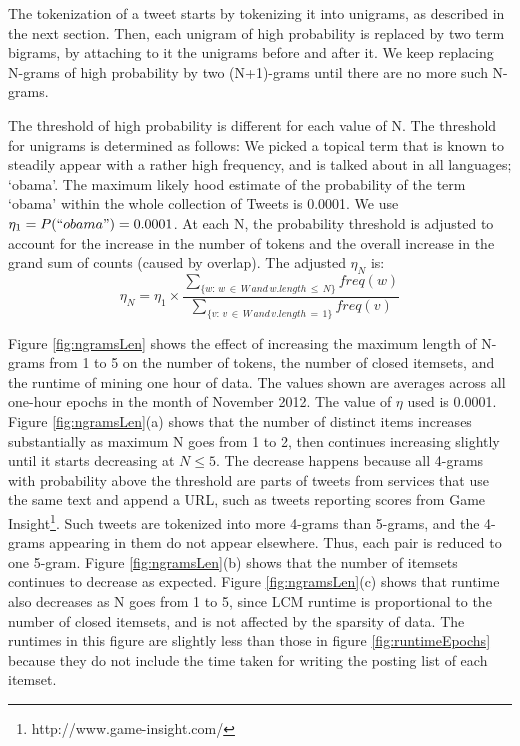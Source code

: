 \documentclass[letterpaper,12pt,titlepage,oneside,final]{book}
\begin{document}
The tokenization of a tweet starts by tokenizing it into unigrams, 
as described in the next section. %
Then, each
unigram of high probability is replaced by two term bigrams, by
attaching to it the unigrams before and after it.
We keep replacing N-grams of high probability by two (N+1)-grams 
until there are no more such N-grams. %

The threshold of high probability is different for each value of N. 
The threshold for unigrams is determined as follows: 
We picked a topical term that is known to  steadily  appear with a rather high frequency, 
and is talked about in all languages; `obama'. 
The maximum likely hood estimate of the probability of the term `obama' within the whole collection of Tweets is 0.0001. 
We use $\eta_1 = P(``obama") = 0.0001$.
At each N, the probability threshold is adjusted to account for the increase
in the number of tokens and the overall increase in the grand sum of counts (caused by overlap).
The adjusted $\eta_N$ is:
\begin{equation}\eta_N = \eta_1 \times \frac{\sum_{\{w:\, w \,\in\, W\, and\, w.length \,\le\, N\}}{freq(w)}}{\sum_{\{v:\, v\, \in\, W \,and \,v.length\,=\,1\}}{freq(v)}}\end{equation}


Figure \ref{fig:ngramsLen} shows the effect of increasing the maximum length
of N-grams from 1 to 5 on the number of tokens, the number of closed itemsets,
and the runtime of mining one hour of data.
The values shown are averages across all one-hour epochs in the month of
November 2012.
The value of $\eta$ used is 0.0001.
Figure \ref{fig:ngramsLen}(a) shows that the number of distinct items
increases substantially as maximum N goes from 1 to 2, then continues increasing
slightly until it starts decreasing at $N \le 5$.
The decrease happens because all 4-grams with probability above the threshold
are parts of tweets from services that use the same text and append a URL,
such as tweets reporting scores from
Game Insight\footnote{http://www.game-insight.com/}.
Such tweets are tokenized into more 4-grams than 5-grams, and the 4-grams
appearing in them do not appear elsewhere.
Thus, each pair is reduced to one 5-gram.
Figure \ref{fig:ngramsLen}(b) shows that the number of itemsets continues to
decrease as expected.
Figure \ref{fig:ngramsLen}(c) shows that runtime also decreases as N goes
from 1 to 5, since LCM runtime is proportional to the number of closed
itemsets, and is not affected by the sparsity of data.
The runtimes in this figure are slightly less than those in
figure \ref{fig:runtimeEpochs} because they do not include the time taken for
writing the posting list of each itemset.
\end{document}
